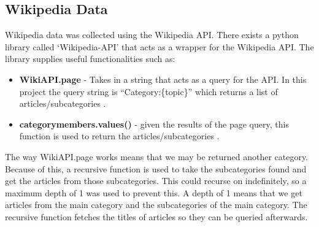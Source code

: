 \subsection{Wikipedia Data}
Wikipedia data was collected using the Wikipedia API. There exists a python library called `Wikipedia-API' \cite{wikiapi} that acts as a wrapper
for the Wikipedia API. The library supplies useful functionalities such as:
\begin{itemize}
    \item \textbf{WikiAPI.page} - Takes in a string that acts as a query for the API. In this project the query string is ``Category:\{topic\}'' which returns a list of articles/subcategories \cite{noauthor_wikipedia_nodate}.
    \item \textbf{categorymembers.values()} - given the results of the page query, this function is used to return the articles/subcategories \cite{noauthor_wikipedia_nodate}.
\end{itemize}
\newpage
The way WikiAPI.page works means that we may be returned another category. Because of this, a recursive function is used to take the subcategories found and get
the articles from those subcategories. This could recurse on indefinitely, so a maximum depth of 1 was used to prevent this. A depth of 1 means that we get articles
from the main category and the subcategories of the main category. The recursive function fetches the titles of articles so they can be queried afterwards.
\begin{algorithm}
    \caption{$get\_category\_members$}\label{alg:cat-members}
\begin{algorithmic}
    \STATE $\text{\textbf{INPUT}: category, level, max\_level}$
    \STATE $category\_members \gets \text{list of articles in category}$
    \bindent
    \STATE $- \textbf{WikiAPI.page(``Category:\{category\}'').}\textbf{categorymembers.values()}}$
    \eindent
    \STATE $titles \gets \text{empty list}$
    \FOR{$\text{each member in category\_members}$}
        \IF{$\text{member is a category AND level<max\_level}$}
            \STATE $titles.append(get\_category\_members(member, level+1, max\_level))$
        \ELSE
            \STATE $titles.append(\text{title of member})$
        \ENDIF
    \ENDFOR
    \RETURN titles
\end{algorithmic}
\end{algorithm}

